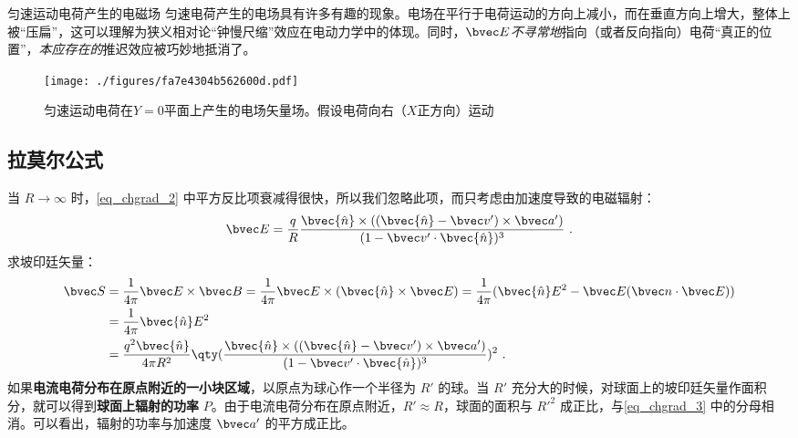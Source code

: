 \begin{example}{匀速运动电荷产生的电磁场}
匀速电荷产生的电场具有许多有趣的现象。电场在平行于电荷运动的方向上减小，而在垂直方向上增大，整体上被“压扁”，这可以理解为狭义相对论“钟慢尺缩”效应在电动力学中的体现。同时，$\bvec E$\textsl{不寻常地}指向（或者反向指向）电荷“真正的位置”，\textsl{本应存在的}推迟效应被巧妙地抵消了\cite{GriffE}。

\begin{figure}[ht]
\centering
\texttt{[image: ./figures/fa7e4304b562600d.pdf]}
\caption{匀速运动电荷在$Y=0$平面上产生的电场矢量场。假设电荷向右（$X$正方向）运动} \label{fig_chgrad_1}
\end{figure}
\end{example}

\subsection{拉莫尔公式}
当 $R\rightarrow \infty$ 时，\autoref{eq_chgrad_2} 中平方反比项衰减得很快，所以我们忽略此项，而只考虑由加速度导致的电磁辐射：
\begin{equation}
\bvec E=\frac{q}{R}\frac{\bvec{\hat n}\times ((\bvec{\hat n}-\bvec v')\times \bvec a')}{(1-\bvec v'\cdot \bvec{\hat n})^3}~.
\end{equation}
求坡印廷矢量：
\begin{equation}\label{eq_chgrad_3}
\begin{aligned}
\bvec S&=\frac{1}{4\pi}\bvec E\times \bvec B=\frac{1}{4\pi}\bvec E\times (\bvec{\hat n}\times \bvec E)=\frac{1}{4\pi}(\bvec{\hat n}E^2-\bvec E(\bvec n\cdot \bvec E))\\
&=\frac{1}{4\pi}\bvec {\hat n}E^2\\
&=\frac{q^2\bvec{\hat n}}{4\pi R^2}\qty(\frac{\bvec{\hat n}\times ((\bvec{\hat n}-\bvec v')\times \bvec a')}{(1-\bvec v'\cdot \bvec{\hat n})^3})^2~.
\end{aligned}
\end{equation}
如果\textbf{电流电荷分布在原点附近的一小块区域}，以原点为球心作一个半径为 $R'$ 的球。当 $R'$ 充分大的时候，对球面上的坡印廷矢量作面积分，就可以得到\textbf{球面上辐射的功率} $P$。由于电流电荷分布在原点附近，$R'\approx R$，球面的面积与 $R'^2$ 成正比，与\autoref{eq_chgrad_3} 中的分母相消。可以看出，辐射的功率与加速度 $\bvec a'$ 的平方成正比。

